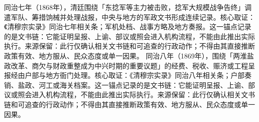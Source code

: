同治七年（1868年），清廷围绕「东捻军等主力被击败，捻军大规模战争告终」调遣军队、筹措饷械并处理战报，中央与地方的军政文书形成连续记录。核心取证：《清穆宗实录》同治七年相关条；军机处档、战事方略及地方奏报。这一锚点记录的是文书链：它能证明呈报、上谕、部议或照会进入机构流程，不能由此推出实际执行。来源保留：此行仅确认相关文书链和可追查的行政动作；不得由其直接推断政策有效、地方服从、民众态度或单一因果。
同治八年（1869年），围绕「两淮盐政改革、商欠与财政重整成为中兴时期的重要议题」的经费、税收、赈济或工程呈报经由户部与地方衙门处理。核心取证：《清穆宗实录》同治八年相关条；户部奏销、盐政、河工或海关档案。这一锚点记录的是文书链：它能证明呈报、上谕、部议或照会进入机构流程，不能由此推出实际执行。来源保留：此行仅确认相关文书链和可追查的行政动作；不得由其直接推断政策有效、地方服从、民众态度或单一因果。
